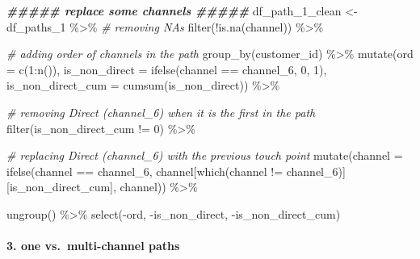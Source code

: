 \documentclass[
]{book}
\newenvironment{Shaded}{\begin{snugshade}}{\end{snugshade}}
\newcommand{\AttributeTok}[1]{\textcolor[rgb]{0.77,0.63,0.00}{#1}}
\newcommand{\CommentTok}[1]{\textcolor[rgb]{0.56,0.35,0.01}{\textit{#1}}}
\newcommand{\DecValTok}[1]{\textcolor[rgb]{0.00,0.00,0.81}{#1}}
\newcommand{\DocumentationTok}[1]{\textcolor[rgb]{0.56,0.35,0.01}{\textbf{\textit{#1}}}}
\newcommand{\FunctionTok}[1]{\textcolor[rgb]{0.00,0.00,0.00}{#1}}
\newcommand{\NormalTok}[1]{#1}
\newcommand{\OtherTok}[1]{\textcolor[rgb]{0.56,0.35,0.01}{#1}}
\newcommand{\SpecialCharTok}[1]{\textcolor[rgb]{0.00,0.00,0.00}{#1}}
\newcommand{\StringTok}[1]{\textcolor[rgb]{0.31,0.60,0.02}{#1}}
\begin{document}
\begin{Shaded}
\begin{Highlighting}[]
\DocumentationTok{\#\#\#\#\# replace some channels \#\#\#\#\#}
\NormalTok{df\_path\_1\_clean }\OtherTok{\textless{}{-}}\NormalTok{ df\_paths\_1 }\SpecialCharTok{\%\textgreater{}\%}
        \CommentTok{\# removing NAs}
        \FunctionTok{filter}\NormalTok{(}\SpecialCharTok{!}\FunctionTok{is.na}\NormalTok{(channel)) }\SpecialCharTok{\%\textgreater{}\%}
         
        \CommentTok{\# adding order of channels in the path}
        \FunctionTok{group\_by}\NormalTok{(customer\_id) }\SpecialCharTok{\%\textgreater{}\%}
        \FunctionTok{mutate}\NormalTok{(}\AttributeTok{ord =} \FunctionTok{c}\NormalTok{(}\DecValTok{1}\SpecialCharTok{:}\FunctionTok{n}\NormalTok{()),}
               \AttributeTok{is\_non\_direct =} \FunctionTok{ifelse}\NormalTok{(channel }\SpecialCharTok{==} \StringTok{\textquotesingle{}channel\_6\textquotesingle{}}\NormalTok{, }\DecValTok{0}\NormalTok{, }\DecValTok{1}\NormalTok{),}
               \AttributeTok{is\_non\_direct\_cum =} \FunctionTok{cumsum}\NormalTok{(is\_non\_direct)) }\SpecialCharTok{\%\textgreater{}\%}
         
        \CommentTok{\# removing Direct (channel\_6) when it is the first in the path}
        \FunctionTok{filter}\NormalTok{(is\_non\_direct\_cum }\SpecialCharTok{!=} \DecValTok{0}\NormalTok{) }\SpecialCharTok{\%\textgreater{}\%}
         
        \CommentTok{\# replacing Direct (channel\_6) with the previous touch point}
        \FunctionTok{mutate}\NormalTok{(}\AttributeTok{channel =} \FunctionTok{ifelse}\NormalTok{(channel }\SpecialCharTok{==} \StringTok{\textquotesingle{}channel\_6\textquotesingle{}}\NormalTok{, channel[}\FunctionTok{which}\NormalTok{(channel }\SpecialCharTok{!=} \StringTok{\textquotesingle{}channel\_6\textquotesingle{}}\NormalTok{)][is\_non\_direct\_cum], channel)) }\SpecialCharTok{\%\textgreater{}\%}
         
        \FunctionTok{ungroup}\NormalTok{() }\SpecialCharTok{\%\textgreater{}\%}
        \FunctionTok{select}\NormalTok{(}\SpecialCharTok{{-}}\NormalTok{ord, }\SpecialCharTok{{-}}\NormalTok{is\_non\_direct, }\SpecialCharTok{{-}}\NormalTok{is\_non\_direct\_cum)}
\end{Highlighting}
\end{Shaded}

\hypertarget{one-vs.-multi-channel-paths}{%
\paragraph{3. one vs.~multi-channel paths}\label{one-vs.-multi-channel-paths}}
\end{document}
